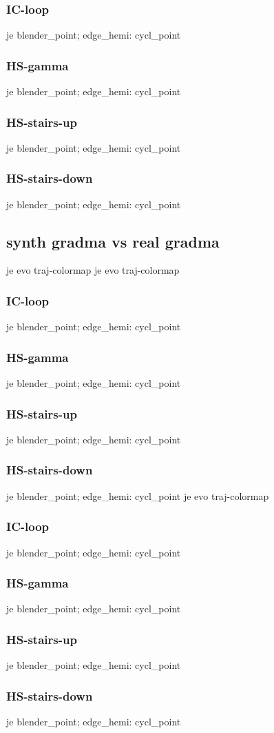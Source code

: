 \subsubsection{IC-loop}
je blender_point; edge_hemi: cycl_point
\subsubsection{HS-gamma}
je blender_point; edge_hemi: cycl_point
\subsubsection{HS-stairs-up}
je blender_point; edge_hemi: cycl_point
\subsubsection{HS-stairs-down}
je blender_point; edge_hemi: cycl_point

\subsection{synth gradma vs real gradma}
je evo traj-colormap
je evo traj-colormap
\subsubsection{IC-loop}
je blender_point; edge_hemi: cycl_point
\subsubsection{HS-gamma}
je blender_point; edge_hemi: cycl_point
\subsubsection{HS-stairs-up}
je blender_point; edge_hemi: cycl_point
\subsubsection{HS-stairs-down}
je blender_point; edge_hemi: cycl_point                              je evo traj-colormap
\subsubsection{IC-loop}
je blender_point; edge_hemi: cycl_point
\subsubsection{HS-gamma}
je blender_point; edge_hemi: cycl_point
\subsubsection{HS-stairs-up}
je blender_point; edge_hemi: cycl_point
\subsubsection{HS-stairs-down}
je blender_point; edge_hemi: cycl_point
